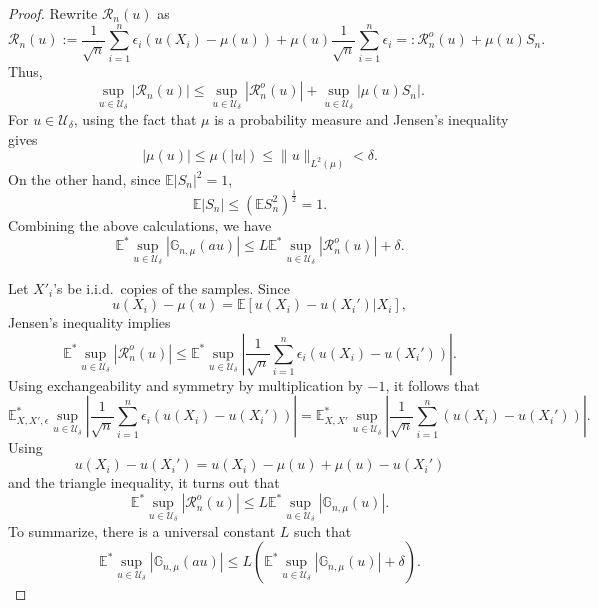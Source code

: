 \documentclass{amsart}
\theoremstyle{plain}
\numberwithin{equation}{section}\newtheorem{theorem}{Theorem}[section]
\theoremstyle{remark}
\begin{document}
\begin{proof}
Rewrite $\mathcal{R}_n (u)$ as
\[
    \mathcal{R}_n (u) := \frac{1}{\sqrt{n}}\sum_{i=1}^n \epsilon_i (u(X_i) - \mu(u)) + \mu(u)\frac{1}{\sqrt{n}}\sum_{i=1}^n \epsilon_i=: \mathcal{R}^o_n (u) + \mu(u) S_n.
\]
Thus, 
\[
    \sup_{u\in\mathcal U_\delta}
\left|
    \mathcal{R}_n (u) \right| \leq \sup_{u\in\mathcal U_\delta}
\left|
    \mathcal{R}^o_n (u) \right| + \sup_{u\in\mathcal U_\delta}
\left|
    \mu(u) S_n \right|.
\]
For $u\in\mathcal U_\delta$, using the fact that $\mu$ is a probability measure and Jensen's inequality gives
\[
    |\mu(u)| \leq \mu (|u|) \leq \|u \|_{L^2(\mu)} < \delta.
\]
On the other hand, since $\mathbb{E}|S_n|^2=1$,
\[
    \mathbb{E} |S_n| \leq (\mathbb{E} S_n^2)^{\frac{1}{2}} =1.
\]
Combining the above calculations, we have
\[
    \mathbb{E}^* \sup_{u\in\mathcal U_\delta}
\left|
    \mathbb{G}_{n,\mu}(au) \right| \leq L \mathbb{E}^* \sup_{u\in\mathcal U_\delta}
\left|
    \mathcal{R}^o_n (u) \right| + \delta.
\]





Let $X'_i$'s be i.i.d.\ copies of the samples. Since
\[
    u(X_i) - \mu(u) = \mathbb{E}[ u(X_i) - u(X_i')| X_i],
\]
Jensen's inequality implies
\[
    \mathbb{E}^* \sup_{u\in\mathcal U_\delta}
\left|
    \mathcal{R}^o_n (u) \right| \leq \mathbb{E}^* \sup_{u\in\mathcal U_\delta}
\left| \frac{1}{\sqrt{n}} \sum_{i=1}^n \epsilon_i( u(X_i) - u(X_i')) \right|.
\]
Using exchangeability and symmetry by multiplication by $-1$, it follows that
\[
     \mathbb{E}^*_{X, X', \epsilon} \sup_{u\in\mathcal U_\delta}
\left| \frac{1}{\sqrt{n}} \sum_{i=1}^n \epsilon_i( u(X_i) - u(X_i')) \right| = \mathbb{E}^*_{X, X'} \sup_{u\in\mathcal U_\delta}
\left| \frac{1}{\sqrt{n}} \sum_{i=1}^n (u(X_i) - u(X_i')) \right|. 
\]
Using
\[
    u(X_i) - u(X_i') = u(X_i) - \mu(u) + \mu(u) - u(X_i')
\]
and the triangle inequality, it turns out that
\[
    \mathbb{E}^* \sup_{u\in\mathcal U_\delta}
\left|
    \mathcal{R}^o_n (u) \right| \leq L \mathbb{E}^* \sup_{u\in\mathcal U_\delta}
\left|
    \mathbb{G}_{n,\mu}(u) \right|.
\]
To summarize, there is a universal constant $L$ such that
\begin{equation}\label{eq: bound G_au by G_u}
    \mathbb{E}^* \sup_{u\in\mathcal U_\delta}
\left|
    \mathbb{G}_{n,\mu}(au) \right| \leq  L \left( \mathbb{E}^* \sup_{u\in\mathcal U_\delta}
\left|
    \mathbb{G}_{n,\mu}(u) \right| + \delta \right).
\end{equation}






\end{proof}
\end{document}
